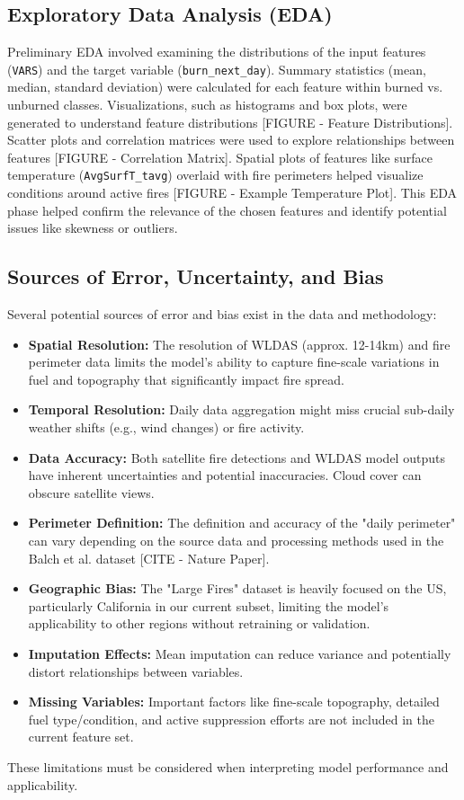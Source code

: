 \documentclass[conference]{IEEEtran}
\begin{document}
\subsection{Exploratory Data Analysis (EDA)}
Preliminary EDA involved examining the distributions of the input features (\texttt{VARS}) and the target variable (\texttt{burn\_next\_day}).
Summary statistics (mean, median, standard deviation) were calculated for each feature within burned vs. unburned classes. Visualizations, such as histograms and box plots, were generated to understand feature distributions [FIGURE - Feature Distributions]. Scatter plots and correlation matrices were used to explore relationships between features [FIGURE - Correlation Matrix]. Spatial plots of features like surface temperature (\texttt{AvgSurfT\_tavg}) overlaid with fire perimeters helped visualize conditions around active fires [FIGURE - Example Temperature Plot]. This EDA phase helped confirm the relevance of the chosen features and identify potential issues like skewness or outliers.

\subsection{Sources of Error, Uncertainty, and Bias}
Several potential sources of error and bias exist in the data and methodology:
\begin{itemize}
    \item \textbf{Spatial Resolution:} The resolution of WLDAS (approx. 12-14km) and fire perimeter data limits the model's ability to capture fine-scale variations in fuel and topography that significantly impact fire spread.
    \item \textbf{Temporal Resolution:} Daily data aggregation might miss crucial sub-daily weather shifts (e.g., wind changes) or fire activity.
    \item \textbf{Data Accuracy:} Both satellite fire detections and WLDAS model outputs have inherent uncertainties and potential inaccuracies. Cloud cover can obscure satellite views.
    \item \textbf{Perimeter Definition:} The definition and accuracy of the "daily perimeter" can vary depending on the source data and processing methods used in the Balch et al. dataset [CITE - Nature Paper].
    \item \textbf{Geographic Bias:} The "Large Fires" dataset is heavily focused on the US, particularly California in our current subset, limiting the model's applicability to other regions without retraining or validation.
    \item \textbf{Imputation Effects:} Mean imputation can reduce variance and potentially distort relationships between variables.
    \item \textbf{Missing Variables:} Important factors like fine-scale topography, detailed fuel type/condition, and active suppression efforts are not included in the current feature set.
\end{itemize}
These limitations must be considered when interpreting model performance and applicability.
\end{document}
